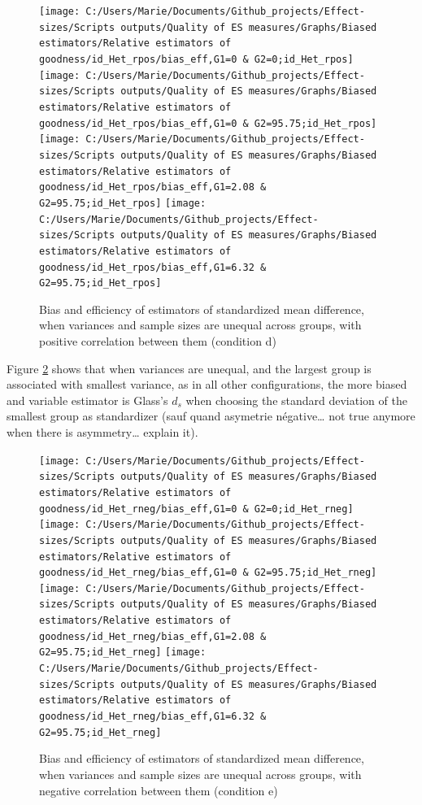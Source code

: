 \documentclass[
  man,floatsintext]{apa6}
\begin{document}
\begin{figure}

{\centering \texttt{[image: C:/Users/Marie/Documents/Github\_projects/Effect-sizes/Scripts outputs/Quality of ES measures/Graphs/Biased estimators/Relative estimators of goodness/id\_Het\_rpos/bias\_eff,G1=0 \& G2=0;id\_Het\_rpos]} \texttt{[image: C:/Users/Marie/Documents/Github\_projects/Effect-sizes/Scripts outputs/Quality of ES measures/Graphs/Biased estimators/Relative estimators of goodness/id\_Het\_rpos/bias\_eff,G1=0 \& G2=95.75;id\_Het\_rpos]} \texttt{[image: C:/Users/Marie/Documents/Github\_projects/Effect-sizes/Scripts outputs/Quality of ES measures/Graphs/Biased estimators/Relative estimators of goodness/id\_Het\_rpos/bias\_eff,G1=2.08 \& G2=95.75;id\_Het\_rpos]} \texttt{[image: C:/Users/Marie/Documents/Github\_projects/Effect-sizes/Scripts outputs/Quality of ES measures/Graphs/Biased estimators/Relative estimators of goodness/id\_Het\_rpos/bias\_eff,G1=6.32 \& G2=95.75;id\_Het\_rpos]} 

}

\caption{Bias and efficiency of estimators of standardized mean difference, when variances and sample sizes are unequal across groups, with positive correlation between them (condition d)}\label{fig:idHetrpos}
\end{figure}

Figure \ref{fig:idHetrneg} shows that when variances are unequal, and the largest group is associated with smallest variance, as in all other configurations, the more biased and variable estimator is Glass's \(d_s\) when choosing the standard deviation of the smallest group as standardizer (sauf quand asymetrie négative\ldots{} not true anymore when there is asymmetry\ldots{} explain it).

\begin{figure}

{\centering \texttt{[image: C:/Users/Marie/Documents/Github\_projects/Effect-sizes/Scripts outputs/Quality of ES measures/Graphs/Biased estimators/Relative estimators of goodness/id\_Het\_rneg/bias\_eff,G1=0 \& G2=0;id\_Het\_rneg]} \texttt{[image: C:/Users/Marie/Documents/Github\_projects/Effect-sizes/Scripts outputs/Quality of ES measures/Graphs/Biased estimators/Relative estimators of goodness/id\_Het\_rneg/bias\_eff,G1=0 \& G2=95.75;id\_Het\_rneg]} \texttt{[image: C:/Users/Marie/Documents/Github\_projects/Effect-sizes/Scripts outputs/Quality of ES measures/Graphs/Biased estimators/Relative estimators of goodness/id\_Het\_rneg/bias\_eff,G1=2.08 \& G2=95.75;id\_Het\_rneg]} \texttt{[image: C:/Users/Marie/Documents/Github\_projects/Effect-sizes/Scripts outputs/Quality of ES measures/Graphs/Biased estimators/Relative estimators of goodness/id\_Het\_rneg/bias\_eff,G1=6.32 \& G2=95.75;id\_Het\_rneg]} 

}

\caption{Bias and efficiency of estimators of standardized mean difference, when variances and sample sizes are unequal across groups, with negative correlation between them (condition e)}\label{fig:idHetrneg}
\end{figure}
\end{document}
